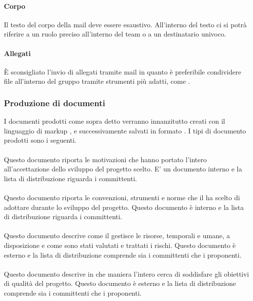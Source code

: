 \paragraph{Corpo}
Il testo del corpo della mail deve essere esaustivo. All'interno del
testo ci si potrà riferire a un ruolo preciso all'interno del team o a un destinatario univoco.

\paragraph{Allegati}
È sconsigliato l'invio di allegati tramite mail in quanto è preferibile condividere file all'interno del gruppo tramite strumenti più adatti, come .

\subsubsection{Produzione di documenti}
I documenti prodotti come sopra detto verranno innanzitutto creati con il linguaggio di markup , e successivamente salvati in formato . I tipi di documento prodotti sono i seguenti.

\paragraph{\SdF}
Questo documento riporta le motivazioni che hanno portato l'intero
 all'accettazione dello sviluppo del progetto scelto. E' un documento interno e la lista di distribuzione riguarda i committenti.

\paragraph{\NdP}
Questo documento riporta le convenzioni, strumenti e
norme che il  ha scelto di adottare durante  lo sviluppo del progetto. Questo
documento è interno e la lista di distribuzione riguarda i committenti.

\paragraph{\PdP}
Questo documento descrive come il  gestisce le risorse, temporali e umane, a disposizione e come sono stati valutati e trattati i rischi. Questo documento è esterno e la lista di distribuzione comprende sia i committenti che i proponenti.

\paragraph{\PdQ}
Questo documento descrive in che maniera l'intero  cerca di soddisfare gli obiettivi di qualità del progetto. Questo documento è esterno e la lista di distribuzione comprende sia i committenti che i proponenti.


